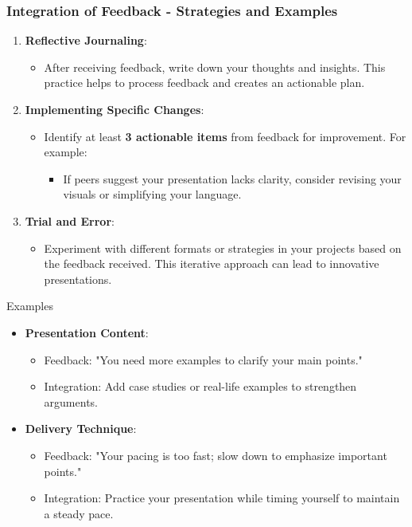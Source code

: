 \documentclass{beamer}
\begin{document}
\begin{frame}[fragile]
    \frametitle{Integration of Feedback - Strategies and Examples}
    \begin{enumerate}
        \item \textbf{Reflective Journaling}:
        \begin{itemize}
            \item After receiving feedback, write down your thoughts and insights. This practice helps to process feedback and creates an actionable plan.
        \end{itemize}
        
        \item \textbf{Implementing Specific Changes}:
        \begin{itemize}
            \item Identify at least \textbf{3 actionable items} from feedback for improvement. For example:
            \begin{itemize}
                \item If peers suggest your presentation lacks clarity, consider revising your visuals or simplifying your language.
            \end{itemize}
        \end{itemize}
        
        \item \textbf{Trial and Error}:
        \begin{itemize}
            \item Experiment with different formats or strategies in your projects based on the feedback received. This iterative approach can lead to innovative presentations.
        \end{itemize}
    \end{enumerate}
    
    \begin{block}{Examples}
        \begin{itemize}
            \item \textbf{Presentation Content}: 
            \begin{itemize}
                \item Feedback: "You need more examples to clarify your main points."
                \item Integration: Add case studies or real-life examples to strengthen arguments.
            \end{itemize}
            
            \item \textbf{Delivery Technique}:
            \begin{itemize}
                \item Feedback: "Your pacing is too fast; slow down to emphasize important points."
                \item Integration: Practice your presentation while timing yourself to maintain a steady pace.
            \end{itemize}
        \end{itemize}
    \end{block}
\end{frame}
\end{document}
